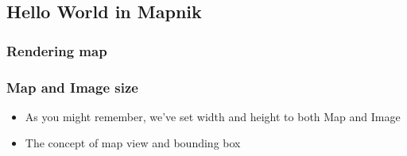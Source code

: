\documentclass[17pt]{beamer}
\begin{document}

\subsection{Hello World in Mapnik}

\begin{frame}
  \frametitle{Rendering map}
\end{frame}

\begin{frame}
  \frametitle{Map and Image size}
  \begin{itemize}
  \item As you might remember, we've set width and
    height to both Map and Image
  \item The concept of map view and bounding box
  \end{itemize}
\end{frame}
\end{document}
